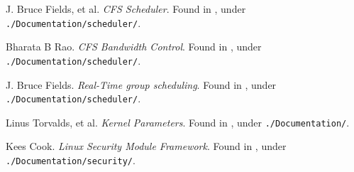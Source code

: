 \begin{thebibliography}{9}

J. Bruce Fields, et al. \emph{CFS Scheduler}.  Found in
\cite{linux-kernel-v3.14.2}, under \texttt{./Documentation/scheduler/}.


Bharata B Rao. \emph{CFS Bandwidth Control}.  Found in
\cite{linux-kernel-v3.14.2}, under \texttt{./Documentation/scheduler/}.


J. Bruce Fields. \emph{Real-Time group scheduling}.  Found in
\cite{linux-kernel-v3.14.2}, under \texttt{./Documentation/scheduler/}.


Linus Torvalds, et al. \emph{Kernel Parameters}. Found in
\cite{linux-kernel-v3.14.2}, under \texttt{./Documentation/}.


Kees Cook. \emph{Linux Security Module Framework}. Found in
\cite{linux-kernel-v3.14.2}, under \texttt{./Documentation/security/}.

\end{thebibliography}
